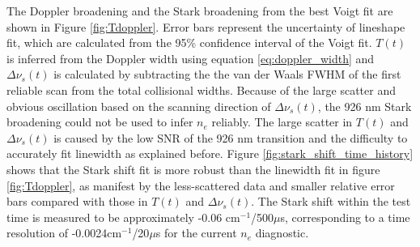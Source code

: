 \documentclass[12pt]{iopart}
\begin{document}
The Doppler broadening and the Stark broadening from the best Voigt fit are shown in Figure \ref{fig:Tdoppler}.  Error bars represent the uncertainty of lineshape fit, which are calculated from the 95\% confidence interval of the Voigt fit. $T(t)$ is inferred from the Doppler width using equation \ref{eq:doppler_width} and $\Delta\nu_s(t)$ is calculated by subtracting the the van der Waals FWHM of the first reliable scan from the total collisional widths. Because of the large scatter and obvious oscillation based on the scanning direction of $\Delta \nu_s(t)$, the 926 nm Stark broadening could not be used to infer $n_e$ reliably. The large scatter in $T(t)$ and  $\Delta\nu_s(t)$ is caused by the low SNR of the 926 nm transition and the difficulty to accurately fit linewidth as explained before. Figure \ref{fig:stark_shift_time_history} shows that the Stark shift fit is more robust than the linewidth fit in figure \ref{fig:Tdoppler}, as manifest by the less-scattered data and smaller relative error bars compared with those in $T(t)$ and  $\Delta\nu_s(t)$. The Stark shift within the test time is measured to be approximately -0.06 cm$^{-1}$/500$\mu$s, corresponding to a time resolution of -0.0024cm$^{-1}$/20$\mu$s for the current $n_e$ diagnostic.
 
\end{document}
